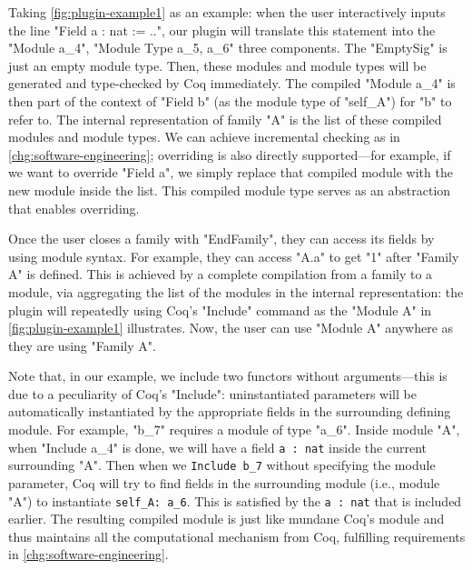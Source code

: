 Taking \cref{fig:plugin-example1} as an example: when the user
interactively inputs the line "Field a : nat := ..", our plugin will
translate this statement into the "Module a_4", "Module Type a_5, a_6"
three components.
{The "EmptySig" is just an empty module type.} Then,
these modules and module types will be generated and type-checked by Coq
immediately. The compiled "Module a_4" is then part of the context of
"Field b" (as the module type of "self_A") for "b" to refer to. The
internal representation of family "A" is the list of these
compiled modules and module types. We can achieve incremental
checking as in \ref{chg:software-engineering}; overriding is also directly supported---for example, if we
want to override "Field a", we simply replace that compiled module with
the new module inside the list. This compiled module type serves as an
abstraction that enables overriding. 

Once the user closes a family with "EndFamily", they can access its fields by using module syntax. For example, they can access "A.a" to get "1" after "Family A" is defined. This is achieved by a complete compilation from a family to a module, via aggregating the list of the modules in the internal representation: the plugin will repeatedly using Coq's "Include" command as the "Module A" in \cref{fig:plugin-example1} illustrates. Now, the user can use "Module A" anywhere as they are using "Family A".

Note that, in our example, we include two
functors without arguments---this is due to a peculiarity of Coq's
"Include": uninstantiated parameters will be automatically
instantiated by the appropriate fields in the surrounding defining
module.
For example, "b_7" requires a module of type "a_6". Inside module "A",
when "Include a_4" is done, we will have a field \texttt{a : nat}
inside the current surrounding "A". Then when we
\texttt{Include b_7} without specifying the module parameter,
Coq will try to find fields in the surrounding module (i.e., module
"A") to instantiate \texttt{self_A: a_6}. This is satisfied by
the \texttt{a : nat} that is included earlier.
The resulting compiled module is just like mundane Coq's module and 
thus maintains all the computational mechanism from Coq, fulfilling requirements in \ref{chg:software-engineering}. 



